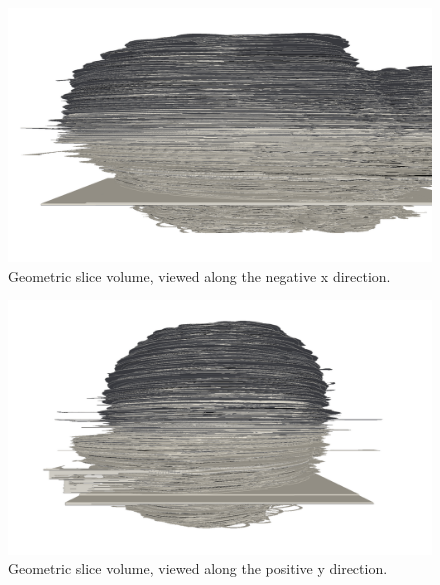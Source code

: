 	\begin{figure}
	  \centering
	  \includegraphics[width=0.9\textheight]{Ch6/Figs/Rat28/contours/whole_negative_x_geometric}
	  \caption{Geometric slice volume, viewed along the negative x direction.}
	  \label{fig:negative_x_geometric_contour}
	\end{figure}

	\begin{figure}
	  \centering
	  \includegraphics[width=0.9\textheight]{Ch6/Figs/Rat28/contours/whole_positive_y_geometric}
	  \caption{Geometric slice volume, viewed along the positive y direction.}
	  \label{fig:positive_y_geometric_contour}
	\end{figure}
  
